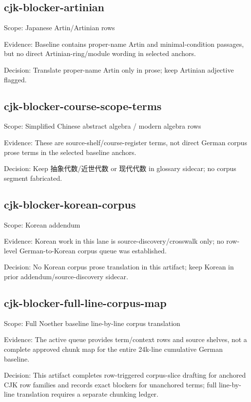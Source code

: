 \documentclass[11pt]{article}
\begin{document}
\subsection*{cjk-blocker-artinian}
Scope: Japanese Artin/Artinian rows\par
Evidence: Baseline contains proper-name Artin and minimal-condition passages, but no direct Artinian-ring/module wording in selected anchors.\par
Decision: Translate proper-name Artin only in prose; keep Artinian adjective flagged.\par
\subsection*{cjk-blocker-course-scope-terms}
Scope: Simplified Chinese abstract algebra / modern algebra rows\par
Evidence: These are source-shelf/course-register terms, not direct German corpus prose terms in the selected baseline anchors.\par
Decision: Keep 抽象代数/近世代数 or 现代代数 in glossary sidecar; no corpus segment fabricated.\par
\subsection*{cjk-blocker-korean-corpus}
Scope: Korean addendum\par
Evidence: Korean work in this lane is source-discovery/crosswalk only; no row-level German-to-Korean corpus queue was established.\par
Decision: No Korean corpus prose translation in this artifact; keep Korean in prior addendum/source-discovery sidecar.\par
\subsection*{cjk-blocker-full-line-corpus-map}
Scope: Full Noether baseline line-by-line corpus translation\par
Evidence: The active queue provides term/context rows and source shelves, not a complete approved chunk map for the entire 24k-line cumulative German baseline.\par
Decision: This artifact completes row-triggered corpus-slice drafting for anchored CJK row families and records exact blockers for unanchored terms; full line-by-line translation requires a separate chunking ledger.\par
\end{document}
